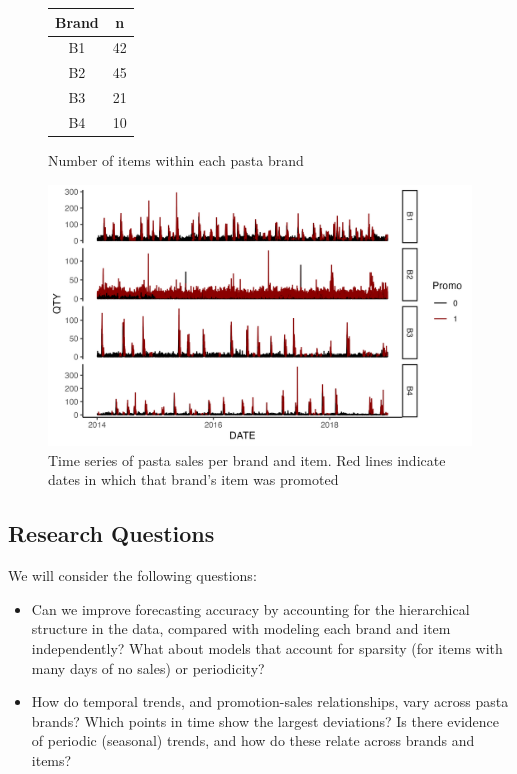 \documentclass{article}
\begin{document}
\begin{figure}[h]
    \centering
    \begin{minipage}{0.4\textwidth}
        \centering
        \begin{tabular}{c|c}
            \hline
            Brand & n \\
            \hline
            B1 & 42 \\
            B2 & 45 \\
            B3 & 21 \\
            B4 & 10 
        \end{tabular}
        \caption{Number of items within each pasta brand}
    \label{tab:tab1}
    \end{minipage}
    \hfill
    \begin{minipage}{0.5\textwidth}
        \centering
        \includegraphics[width=\linewidth]{promotion_time_series.png} %
        \caption{Time series of pasta sales per brand and item. Red lines indicate dates in which that brand's item was promoted}
        \label{fig:fig1}
    \end{minipage}    
\end{figure}

\subsection*{Research Questions}
\noindent We will consider the following questions: 

\begin{itemize}
    \item Can we improve forecasting accuracy by accounting for the hierarchical structure in the data, compared with modeling each brand and item independently? What about models that account for sparsity (for items with many days of no sales) or periodicity?
    \item How do temporal trends, and promotion-sales relationships, vary across pasta brands? Which points in time show the largest deviations? Is there evidence of periodic (seasonal) trends, and how do these relate across brands and items?
\end{itemize}
\end{document}
